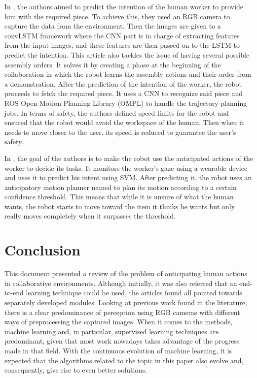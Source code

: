\documentclass[conference]{IEEEtran}
\begin{document}
In \textcite{Zhang2022}, the authors aimed to predict the intention of the human worker to provide him with the required piece. To achieve this, they used an RGB camera to capture the data from the environment. Then the images are given to a convLSTM framework where the CNN part is in charge of extracting features from the input images, and these features are then passed on to the LSTM to predict the intention. This article also tackles the issue of having several possible assembly orders. It solves it by creating a phase at the beginning of the collaboration in which the robot learns the assembly actions and their order from a demonstration. After the prediction of the intention of the worker, the robot proceeds to fetch the required piece. It uses a CNN to recognize said piece and ROS Open Motion Planning Library (OMPL) to handle the trajectory planning jobs. In terms of safety, the authors defined speed limits for the robot and ensured that the robot would avoid the workspace of the human. Then when it needs to move closer to the user, its speed is reduced to guarantee the user’s safety.

In \textcite{Huang2016}, the goal of the authors is to make the robot use the anticipated actions of the worker to decide its tasks. It monitors the worker’s gaze using a wearable device and uses it to predict his intent using SVM. After predicting it, the robot uses an anticipatory motion planner named  to plan its motion according to a certain confidence threshold. This means that while it is unsure of what the human wants, the robot starts to move toward the item it thinks he wants but only really moves completely when it surpasses the threshold.

\section{Conclusion}
\label{chapter:conclusion}

This document presented a review of the problem of anticipating human actions in collaborative environments. Although initially, it was also referred that an end-to-end learning technique could be used, the articles found all pointed towards separately developed modules. Looking at previous work found in the literature, there is a clear predominance of perception using RGB cameras with different ways of preprocessing the captured images. When it comes to the methods, machine learning and, in particular, supervised learning techniques are predominant, given that most work nowadays takes advantage of the progress made in that field. With the continuous evolution of machine learning, it is expected that the algorithms related to the topic in this paper also evolve and, consequently, give rise to even better solutions.
\end{document}
